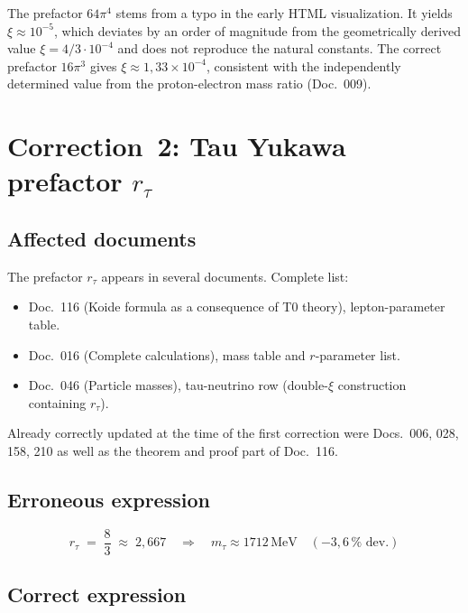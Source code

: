 The prefactor $64\pi^4$ stems from a typo in the early HTML visualization. It
yields $\xi \approx 10^{-5}$, which deviates by an order of magnitude from the
geometrically derived value $\xi = 4/3 \cdot 10^{-4}$ and does not reproduce
the natural constants. The correct prefactor $16\pi^3$ gives
$\xi \approx 1{,}33 \times 10^{-4}$, consistent with the independently
determined value from the proton-electron mass ratio (Doc.~009).

\section{\texorpdfstring{Correction~2: Tau Yukawa prefactor $r_\tau$}{Correction 2: Tau Yukawa prefactor r-tau}}

\subsection*{Affected documents}

The prefactor $r_\tau$ appears in several documents. Complete list:
\begin{itemize}
  \item Doc.~116 (Koide formula as a consequence of T0 theory),
        lepton-parameter table.
  \item Doc.~016 (Complete calculations), mass table and
        $r$-parameter list.
  \item Doc.~046 (Particle masses), tau-neutrino row
        (double-$\xi$ construction containing $r_\tau$).
\end{itemize}
Already correctly updated at the time of the first correction were
Docs.~006, 028, 158, 210 as well as the theorem and proof part of Doc.~116.

\subsection*{Erroneous expression}

\begin{equation}
  r_\tau \;=\; \frac{8}{3} \;\approx\; 2{,}667
  \quad \Rightarrow \quad
  m_\tau \approx 1712\,\text{MeV} \quad (-3{,}6\,\% \text{ dev.})
  \tag{old -- wrong}
\end{equation}

\subsection*{Correct expression}


